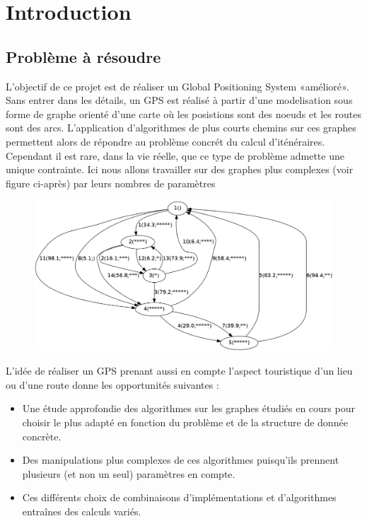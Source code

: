 \chapter{Introduction}

\renewcommand{\labelitemi}{$\bullet$}
\section{Problème à résoudre}
L'objectif de ce projet est de réaliser un Global Positioning System «amélioré». Sans entrer dans les détails, un GPS est réalisé à partir d'une modelisation sous forme de graphe orienté d'une carte où les posistions sont des noeuds et les routes sont des arcs. L'application d'algorithmes de plus courts chemins sur ces graphes permettent alors de répondre au problème concrét du calcul d'iténéraires. Cependant il est rare, dans la vie réelle, que ce type de problème admette une unique contrainte. Ici nous allons travailler sur des graphes plus complexes (voir figure ci-après) par leurs nombres de paramètres
\begin{figure}[!h] 
\begin{center}
  \includegraphics[scale=0.40]{g.png}
\end{center}
\end{figure} 

L'idée de réaliser un GPS prenant aussi en compte l'aspect touristique d'un lieu ou d'une route donne les opportunités suivantes : 
\begin{itemize}
\item
Une étude approfondie des algorithmes sur les graphes étudiés en cours pour choisir le plus adapté en fonction du problème et de la structure de donnée concrète.
\clearpage
\item
Des manipulations plus complexes de ces algorithmes puisqu'ils prennent plusieurs (et non un seul) paramètres en compte.
\item
Ces différents choix de combinaisons d'implémentations et d'algorithmes entraînes des calculs variés.
\end{itemize}

